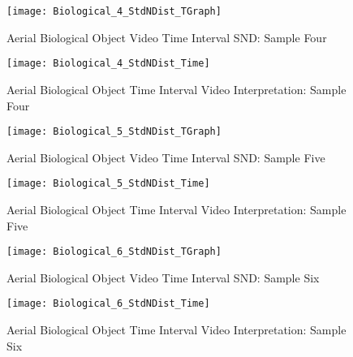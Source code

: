 \newpage  %


\begin{figure}[H]
	\center 
	\texttt{[image: Biological\_4\_StdNDist\_TGraph]}
	\captionsetup{list=no}	
	\caption[Aerial Biological Object Video Time Interval SND: Sample Four]{Aerial Biological Object Video Time Interval SND: Sample Four}
\end{figure}

\begin{figure}[H]
	\center 
	\texttt{[image: Biological\_4\_StdNDist\_Time]}
	\captionsetup{list=no}	
	\caption[Aerial Biological Object Time Interval Video Interpretation: Sample Four]{Aerial Biological Object Time Interval Video Interpretation: Sample Four}
\end{figure}

\newpage  %


\begin{figure}[H]
	\center 
	\texttt{[image: Biological\_5\_StdNDist\_TGraph]}
	\captionsetup{list=no}	
	\caption[Aerial Biological Object Video Time Interval SND: Sample Five]{Aerial Biological Object Video Time Interval SND: Sample Five}
\end{figure}

\begin{figure}[H]
	\center 
	\texttt{[image: Biological\_5\_StdNDist\_Time]}
	\captionsetup{list=no}
	\caption[Aerial Biological Object Time Interval Video Interpretation: Sample Five]{Aerial Biological Object Time Interval Video Interpretation: Sample Five}
\end{figure}

\newpage  %


\begin{figure}[H]
	\center 
	\texttt{[image: Biological\_6\_StdNDist\_TGraph]}
	\captionsetup{list=no}
	\caption[Aerial Biological Object Video Time Interval SND: Sample Six]{Aerial Biological Object Video Time Interval SND: Sample Six}
\end{figure}

\begin{figure}[H]
	\center 
	\texttt{[image: Biological\_6\_StdNDist\_Time]}
	\captionsetup{list=no}	
	\caption[Aerial Biological Object Time Interval Video Interpretation: Sample Six]{Aerial Biological Object Time Interval Video Interpretation: Sample Six}
\end{figure}

